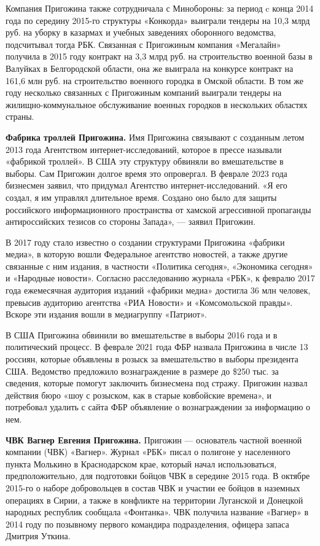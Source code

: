 Компания Пригожина также сотрудничала с Минобороны: за период c конца 2014 года по середину 2015-го структуры «Конкорда» выиграли тендеры на 10,3 млрд руб. на уборку в казармах и учебных заведениях оборонного ведомства, подсчитывал тогда РБК. Связанная с Пригожиным компания «Мегалайн» получила в 2015 году контракт на 3,3 млрд руб. на строительство военной базы в Валуйках в Белгородской области, она же выиграла на конкурсе контракт на 161,6 млн руб. на строительство военного городка в Омской области. В том же году несколько связанных с Пригожиным компаний выиграли тендеры на жилищно-коммунальное обслуживание военных городков в нескольких областях страны.

\textbf{Фабрика троллей Пригожина.} Имя Пригожина связывают с созданным летом 2013 года Агентством интернет-исследований, которое в прессе называли «фабрикой троллей». В США эту структуру обвиняли во вмешательстве в выборы. Сам Пригожин долгое время это опровергал. В феврале 2023 года бизнесмен заявил, что придумал Агентство интернет-исследований. «Я его создал, я им управлял длительное время. Создано оно было для защиты российского информационного пространства от хамской агрессивной пропаганды антироссийских тезисов со стороны Запада», --- заявил Пригожин.

В 2017 году стало известно о создании структурами Пригожина «фабрики медиа», в которую вошли Федеральное агентство новостей, а также другие связанные с ним издания, в частности «Политика сегодня», «Экономика сегодня» и «Народные новости». Согласно расследованию журнала «РБК», к февралю 2017 года ежемесячная аудитория изданий «фабрики медиа» достигла 36 млн человек, превысив аудиторию агентства «РИА Новости» и «Комсомольской правды». Вскоре эти издания вошли в медиагруппу «Патриот».

В США Пригожина обвинили во вмешательстве в выборы 2016 года и в политический процесс. В феврале 2021 года ФБР назвала Пригожина в числе 13 россиян, которые объявлены в розыск за вмешательство в выборы президента США. Ведомство предложило вознаграждение в размере до \$250 тыс. за сведения, которые помогут заключить бизнесмена под стражу. Пригожин назвал действия бюро «шоу с розыском, как в старые ковбойские времена», и потребовал удалить с сайта ФБР объявление о вознаграждении за информацию о нем.

\textbf{ЧВК Вагнер Евгения Пригожина.} Пригожин — основатель частной военной компании (ЧВК) «Вагнер». Журнал «РБК» писал о полигоне у населенного пункта Молькино в Краснодарском крае, который начал использоваться, предположительно, для подготовки бойцов ЧВК в середине 2015 года. В октябре 2015-го о наборе добровольцев в состав ЧВК и участии ее бойцов в наземных операциях в Сирии, а также в конфликте на территории Луганской и Донецкой народных республик сообщала «Фонтанка». ЧВК получила название «Вагнер» в 2014 году по позывному первого командира подразделения, офицера запаса Дмитрия Уткина.

